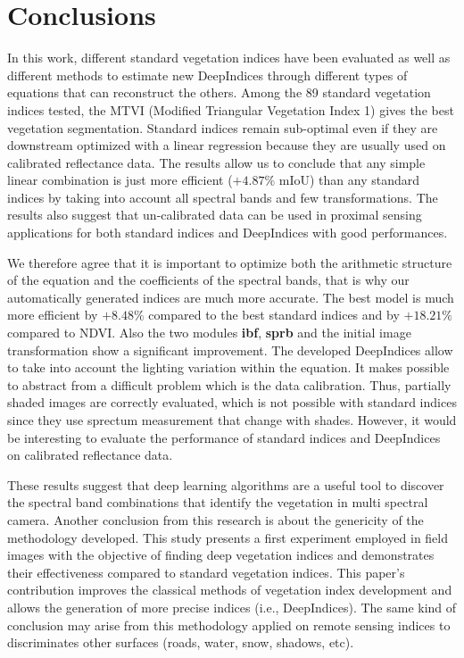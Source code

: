 \documentclass[../thesis.tex]{subfiles}
\begin{document}
	\newpage
	\section{Conclusions}
	\label{sec:conclusions}
	
	In this work, different standard vegetation indices have been evaluated as well as different methods to estimate new DeepIndices through different types of equations that can reconstruct the others. Among the 89 standard vegetation indices tested, the MTVI (Modified Triangular Vegetation Index 1) gives the best vegetation segmentation. Standard indices remain sub-optimal even if they are downstream optimized with a linear regression because they are usually used on calibrated reflectance data. The results allow us to conclude that any simple linear combination is just more efficient ($+4.87\%$ mIoU) than any standard indices by taking into account all spectral bands and few transformations. The results also suggest that un-calibrated data can be used in proximal sensing applications for both standard indices and DeepIndices with good performances.
	
	We therefore agree that it is important to optimize both the arithmetic structure of the equation and the coefficients of the spectral bands, that is why our automatically generated indices are much more accurate. The best model is much more efficient by $+8.48\%$ compared to the best standard indices and by $+18.21\%$ compared to NDVI. Also the two modules \textbf{ibf}, \textbf{sprb} and the initial image transformation show a significant improvement. The developed DeepIndices allow to take into account the lighting variation within the equation. It makes possible to abstract from a difficult problem which is the data calibration. Thus, partially shaded images are correctly evaluated, which is not possible with standard indices since they use sprectum measurement that change with shades. However, it would be interesting to evaluate the performance of standard indices and DeepIndices on calibrated reflectance data.
	
	These results suggest that deep learning algorithms are a useful tool to discover the spectral band combinations that identify the vegetation in multi spectral camera. Another conclusion from this research is about the genericity of the methodology developed. This study presents a first experiment employed in field images with the objective of finding deep vegetation indices and demonstrates their effectiveness compared to standard vegetation indices. This paper's contribution improves the classical methods of vegetation index development and allows the generation of more precise indices (i.e., DeepIndices). The same kind of conclusion may arise from this methodology applied on remote sensing indices to discriminates other surfaces (roads, water, snow, shadows, etc).
\end{document}
